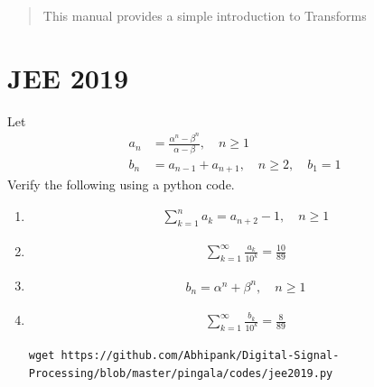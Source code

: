 \documentclass[journal,12pt,twocolumn]{IEEEtran}
\renewcommand\thesection{\arabic{section}}
\begin{document}
% 
\maketitle
\tableofcontents
\renewcommand{\thefigure}{\theenumi}
\renewcommand{\thetable}{\theenumi}
\bigskip
\begin{abstract}
This manual provides a simple introduction to Transforms
\end{abstract}
\section{JEE 2019}
Let 
\begin{align}
	a_n &= \frac{\alpha^{n}-\beta^{n}}{\alpha - \beta}, \quad n \ge 1
	\\
	b_n &= a_{n-1} + a_{n+1}, \quad n \ge 2, \quad b_1 =1
	\label{eq:10-orig-diff}
\end{align}
Verify the following using a python code.
\begin{enumerate}[label=\thesection.\arabic*
,ref=\thesection.\theenumi]
\item 
\begin{align}
	\sum_{k=1}^{n}a_k = a_{n+2}-1, \quad n \ge 1
\end{align}
 \item 
\begin{align}
	\sum_{k=1}^{\infty}\frac{a_k}{10^k} =\frac{10}{89}
\end{align}
 \item 
\begin{align}
	b_n =\alpha^n + \beta^n, \quad n \ge 1
\end{align}
 \item 
\begin{align}
	\sum_{k=1}^{\infty}\frac{b_k}{10^k} =\frac{8}{89}
\end{align}
\solution
\begin{lstlisting}
wget https://github.com/Abhipank/Digital-Signal-Processing/blob/master/pingala/codes/jee2019.py	
\end{lstlisting}
\end{enumerate}
\end{document}
